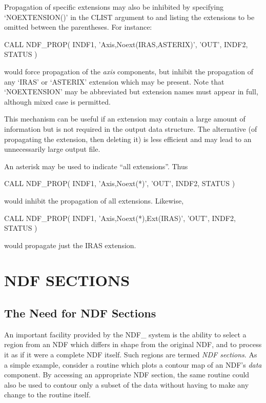 \documentclass[twoside,11pt,nolof]{starlink}
\providecommand{\st}[1]{{\emph{#1}}}
\begin{document}
Propagation of specific extensions may also be inhibited by specifying
`NOEXTENSION()' in the CLIST argument to  and listing the
extensions to be omitted between the parentheses.
For instance:

\small
\begin{terminalv}
      CALL NDF_PROP( INDF1, 'Axis,Noext(IRAS,ASTERIX)', 'OUT', INDF2, STATUS )
\end{terminalv}
\normalsize

would force propagation of the \st{axis\/} components, but inhibit the
propagation of any `IRAS' or `ASTERIX' extension which may be present.
Note that `NOEXTENSION' may be abbreviated but extension names must appear
in full, although mixed case is permitted.

This mechanism can be useful if an extension may contain a large amount of
information but is not required in the output data structure.
The alternative (of propagating the extension, then deleting it) is less
efficient and may lead to an unnecessarily large output file.

An asterisk may be used to indicate ``all extensions''. Thus

\small
\begin{terminalv}
      CALL NDF_PROP( INDF1, 'Axis,Noext(*)', 'OUT', INDF2, STATUS )
\end{terminalv}
\normalsize

would inhibit the propagation of all extensions. Likewise,

\small
\begin{terminalv}
      CALL NDF_PROP( INDF1, 'Axis,Noext(*),Ext(IRAS)', 'OUT', INDF2, STATUS )
\end{terminalv}
\normalsize

would propagate just the IRAS extension.


\section{\label{ss:ndfsections}NDF SECTIONS}

\subsection{The Need for NDF Sections}

An important facility provided by the NDF\_ system is the ability to select
a region from an NDF which differs in shape from the original NDF, and to
process it as if it were a complete NDF itself.
Such regions are termed \st{NDF sections}.
As a simple example, consider a routine which plots a contour map of an
NDF's \st{data\/} component.
By accessing an appropriate NDF section, the same routine could also be used
to contour only a subset of the data without having to make any change to
the routine itself.
\end{document}
